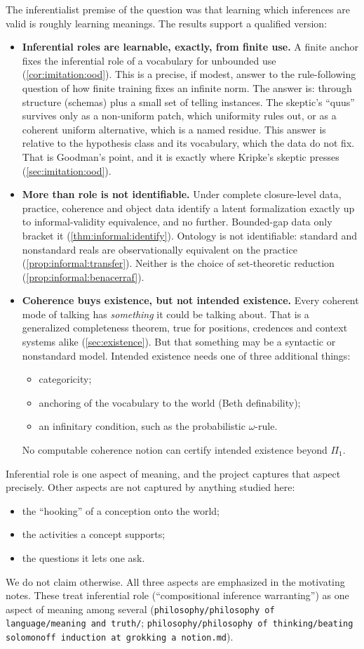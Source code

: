 The inferentialist premise of the question was that learning which inferences are valid is roughly learning meanings. The results support a qualified version:
\begin{itemize}
\item \textbf{Inferential roles are learnable, exactly, from finite use.} A finite anchor fixes the inferential role of a vocabulary for unbounded use (\cref{cor:imitation:ood}). This is a precise, if modest, answer to the rule-following question of how finite training fixes an infinite norm. The answer is: through structure (schemas) plus a small set of telling instances. The skeptic's ``quus'' survives only as a non-uniform patch, which uniformity rules out, or as a coherent uniform alternative, which is a named residue. This answer is relative to the hypothesis class and its vocabulary, which the data do not fix. That is Goodman's point, and it is exactly where Kripke's skeptic presses (\cref{sec:imitation:ood}).
\item \textbf{More than role is not identifiable.} Under complete closure-level data, practice, coherence and object data identify a latent formalization exactly up to informal-validity equivalence, and no further. Bounded-gap data only bracket it (\cref{thm:informal:identify}). Ontology is not identifiable: standard and nonstandard reals are observationally equivalent on the practice (\cref{prop:informal:transfer}). Neither is the choice of set-theoretic reduction (\cref{prop:informal:benacerraf}).
\item \textbf{Coherence buys existence, but not intended existence.} Every coherent mode of talking has \emph{something} it could be talking about. That is a generalized completeness theorem, true for positions, credences and context systems alike (\cref{sec:existence}). But that something may be a syntactic or nonstandard model. Intended existence needs one of three additional things:
  \begin{itemize}
  \item categoricity;
  \item anchoring of the vocabulary to the world (Beth definability);
  \item an infinitary condition, such as the probabilistic $\omega$-rule.
  \end{itemize}
  No computable coherence notion can certify intended existence beyond $\Pi_1$.
\end{itemize}
Inferential role is one aspect of meaning, and the project captures that aspect precisely. Other aspects are not captured by anything studied here:
\begin{itemize}
\item the ``hooking'' of a conception onto the world;
\item the activities a concept supports;
\item the questions it lets one ask.
\end{itemize}
We do not claim otherwise. All three aspects are emphasized in the motivating notes. These treat inferential role (``compositional inference warranting'') as one aspect of meaning among several (\texttt{philosophy/philosophy of language/meaning and truth/}; \texttt{philosophy/philosophy of thinking/beating solomonoff induction at grokking a notion.md}).

